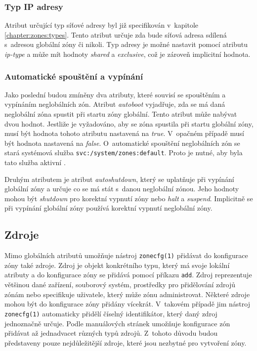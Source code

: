 \subsubsection{Typ IP adresy}
\label{chapter:zones:configuration:global_attributes:ip-type}
Atribut určující typ síťové adresy byl již specifikován v~kapitole \ref{chapter:zones:types}. Tento atribut určuje zda bude síťová adresa
sdílená s~adresou globální zóny či nikoli. Typ adresy je možné nastavit pomocí atributu \textit{ip-type} a může mít hodnoty \textit{shared} a 
\textit{exclusive}, což je zároveň implicitní hodnota.
\subsubsection{Automatické spouštění a vypínání}
\label{chapter:zones:configuration:global_attributes:autoboot}
Jako poslední budou zmíněny dva atributy, které souvisí se spouštěním a vypínáním neglobálních zón. Atribut \textit{autoboot} vyjadřuje,
zda se má daná neglobální zóna spustit při startu zóny globální. Tento atribut může nabývat dvou hodnot. Jestliže je vyžadováno,
aby se zóna spustila při startu globální zóny, musí být hodnota tohoto atributu nastavená na \textit{true}. V~opačném případě
musí být hodnota nastavená na \textit{false}. O~automatické spouštění neglobálních zón se stará systémová služba \verb|svc:/system/zones:default|.
Proto je nutné, aby byla tato služba aktivní \cite{oracle:manpages:zonecfg}.

Druhým atributem je atribut \textit{autoshutdown}, který se uplatňuje při vypínání globální zóny a určuje co se má stát
s~danou neglobální zónou. Jeho hodnoty mohou být \textit{shutdown} pro korektní vypnutí zóny nebo \textit{halt} a \textit{suspend}.
Implicitně se při vypínání globální zóny používá korektní vypnutí neglobální zóny.
\subsection{Zdroje}
\label{chapter:zones:configuration:resources}
Mimo globálních atributů umožňuje nástroj \verb|zonecfg(1)| přidávat do konfigurace zóny také zdroje. Zdroj je objekt
konkrétního typu, který má svoje lokální atributy a do konfigurace zóny se přidává pomocí příkazu \verb|add|. Zdroj reprezentuje
většinou dané zařízení, souborový systém, prostředky pro přidělování zdrojů zónám nebo specifikuje uživatele,
který může zónu administrovat. Některé zdroje mohou být do konfigurace zóny přidány vícekrát. V~takovém případě jim nástroj \verb|zonecfg(1)|
automaticky přidělí číselný identifikátor, který daný zdroj jednoznačně určuje. Podle manuálových stránek \cite{oracle:manpages:zonecfg}
umožňuje konfigurace zón přidávat až jednadvacet různých typů zdrojů. Z~tohoto důvodu budou představeny pouze nejdůležitější 
zdroje, které jsou nezbytné pro vytvoření zóny.
